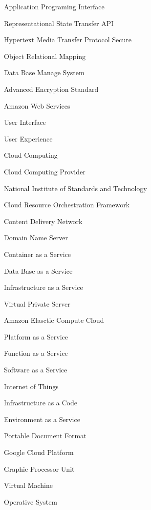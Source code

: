     {Application Programing Interface}

    {\gls{Representational State Transfer API}}

    {\gls{Hypertext Media Transfer Protocol Secure}}

    {Object Relational Mapping}

    {\gls{Data Base Manage System}}

    {Advanced Encryption Standard}
 
    {\gls{Amazon Web Services}}
  
    {\gls{User Interface}}

    {User Experience}

    {\gls{Cloud Computing}}

    {\gls{Cloud Computing Provider}}

    {National Institute of Standards and Technology}

    {Cloud Resource Orchestration Framework}

    {Content Delivery Network}

    {Domain Name Server}

    {Container as a Service}

    {Data Base as a Service}

    {Infrastructure as a Service}

    {Virtual Private Server}

    {Amazon Elasctic Compute Cloud}

    {Platform as a Service}

    {Function as a Service}

    {Software as a Service}

    {Internet of Things}

    {Infrastructure as a Code}

    {Environment as a Service}

    {Portable Document Format}

    {Google Cloud Platform}

    {Graphic Processor Unit}

    {Virtual Machine}

    {Operative System}
